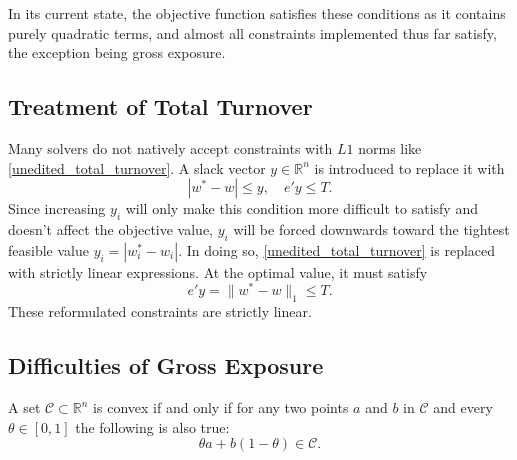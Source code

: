 \documentclass[11pt, letterpaper]{article}
\begin{document}
In its current state, the objective function satisfies these conditions as it contains purely quadratic terms, and almost all constraints
implemented thus far satisfy, the exception being gross exposure.
\subsection{Treatment of Total Turnover}
\label{total_turnover_section}
Many solvers do not natively accept constraints with $L1$ norms like \eqref{unedited_total_turnover}. A slack vector
$y \in \mathds{R}^n$ is introduced to replace it with
\begin{equation}\label{eq:tvr-slack}
	|w^* - w| \leq y, \quad e'y \leq T.
\end{equation}
Since increasing $y_i$ will only make this condition more difficult to satisfy and doesn't affect the objective value, $y_i$
will be forced downwards toward the tightest feasible value $y_i = |w_i^* - w_i|$. In doing so, \eqref{unedited_total_turnover}
is replaced with strictly linear expressions. At the optimal value, it must satisfy
\begin{equation*}
    e' y = \lVert w^* - w\rVert_1 \leq T.
\end{equation*}
These reformulated constraints are strictly linear.


\subsection{Difficulties of Gross Exposure}
\label{gross_exposure_section}
A set $\mathcal{C} \subset \mathds{R}^n$ is convex if and only if for any two points $a$ and $b$ in $\mathcal{C}$ and every
$\theta \in [0,1]$ the following is also true:
\begin{equation}
    \label{convexity_definition}
	\theta a + b (1 - \theta) \in \mathcal{C}.
\end{equation}
\end{document}
